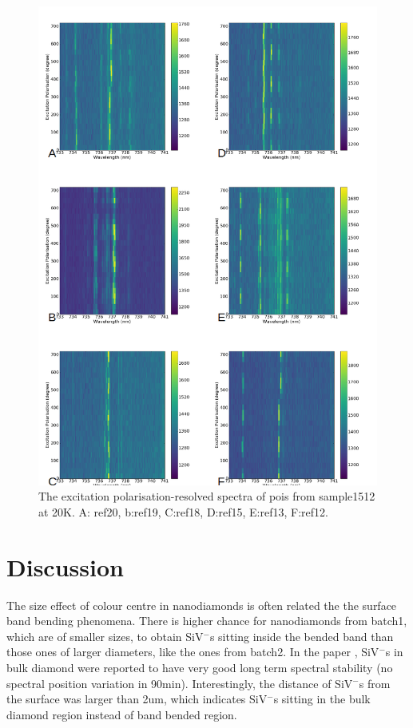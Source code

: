 \begin{figure}[h]
\centering
\includegraphics[width=1\linewidth]{Figures/pic/hydrogenterminationpolarisation}
\caption{The excitation polarisation-resolved spectra of pois from sample1512 at 20K. A: ref20, b:ref19, C:ref18, D:ref15, E:ref13, F:ref12.}
\label{fig:hydrogenterminationpolarisation}
\end{figure}



\section{Discussion}

The size effect of colour centre in nanodiamonds is often related the the surface band bending phenomena. There is higher chance for nanodiamonds from batch1, which are of smaller sizes, to obtain SiV$^{-}$s sitting inside the bended band than those ones of larger diameters, like the ones from batch2. In the paper \citep{rogers_multiple_2013}, SiV$^{-}$s in bulk diamond were reported to have very good long term spectral stability (no spectral position variation in 90min). Interestingly, the distance of SiV$^{-}$s from the surface was larger than 2um, which indicates SiV$^{-}$s sitting in the bulk diamond region instead of band bended region. 

